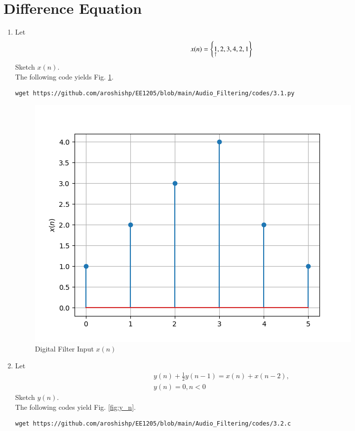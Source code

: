 \documentclass[journal,12pt,twocolumn]{IEEEtran}
\theoremstyle{remark}
\renewcommand\thesection{\arabic{section}}
\numberwithin{equation}{subsection}
\begin{document}
\section{Difference Equation}
\begin{enumerate}[label=\thesection.\arabic*,ref=\thesection.\theenumi]
\item Let
\begin{equation}
x(n) = \left\{\underset{\uparrow}{1},2,3,4,2,1\right\}
\end{equation}
Sketch $x(n)$.\\

\solution The following code yields Fig. \ref{fig:x_n}.
\begin{lstlisting}
wget https://github.com/aroshishp/EE1205/blob/main/Audio_Filtering/codes/3.1.py
\end{lstlisting}
\begin{figure}[!h]
    \centering
    \includegraphics[width = \columnwidth]{figs/3.1.png}
    \caption{Digital Filter Input $x(n)$}
    \label{fig:x_n}
\end{figure}

\item Let
\begin{multline}
\label{eq:iir_filter}
y(n) + \frac{1}{2}y(n-1) = x(n) + x(n-2), 
\\
 y(n) = 0, n < 0
\end{multline}
Sketch $y(n)$.
\\
\solution The following codes yield Fig. \ref{fig:y_n}.
\begin{lstlisting}
wget https://github.com/aroshishp/EE1205/blob/main/Audio_Filtering/codes/3.2.c


\end{lstlisting}
\end{enumerate}
\end{document}
